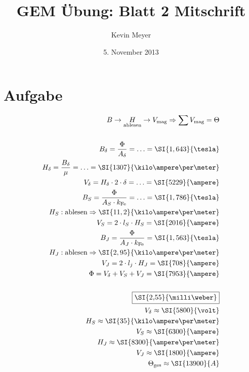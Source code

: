 \documentclass[10pt,a4paper]{article}
\begin{document}
\title{GEM Übung: \textbf{Blatt 2} Mitschrift}
\date{5. November 2013}
\author{Kevin Meyer}
\maketitle


\section{Aufgabe}

\begin{align*}
B \rightarrow \underset{\text{ablesen}}{H} \rightarrow V_\text{mag} 
\Rightarrow \sum V_\text{mag} = \Theta \\ \\
B_\delta = \frac{\Phi}{A_\delta} = \ldots = \SI{1,643}{\tesla} \\
H_\delta = \frac{B_\delta}{\mu} = \ldots = \SI{1307}{\kilo\ampere\per\meter} \\
V_\delta = H_\delta\cdot 2\cdot \delta = \ldots = \SI{5229}{\ampere}\\
B_S = \frac{\Phi}{A_S\cdot k_\text{Fe}} = \ldots = \SI{1,786}{\tesla}\\
H_S: \text{ablesen} \Rightarrow \SI{11,2}{\kilo\ampere\per\meter}\\
V_S = 2\cdot l_S\cdot H_S = \SI{2016}{\ampere}\\
B_J = \frac{\Phi}{A_J\cdot k_\text{Fe}} = \SI{1,563}{\tesla}\\
H_J: \text{ablesen} \Rightarrow \SI{2,95}{\kilo\ampere\per\meter}\\
V_J = 2\cdot l_j\cdot H_J = \SI{708}{\ampere}\\
\Phi = V_\delta + V_S +V_J = \SI{7953}{\ampere}\\ \\
\framebox{\SI{2,55}{\milli\weber}} \\
V_\delta \approx \SI{5800}{\volt}\\
H_S \approx \SI{35}{\kilo\ampere\per\meter}\\
V_S \approx \SI{6300}{\ampere}\\
H_J \approx \SI{8300}{\ampere\per\meter}\\
V_J \approx \SI{1800}{\ampere}\\
\Theta_\text{ges} \approx \SI{13900}{A}
\end{align*}
\end{document}
